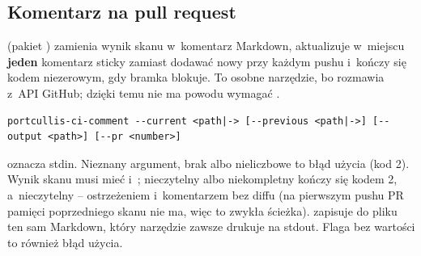 \subsection{Komentarz na pull request}\label{sec:portcullis-komentarz}

 (pakiet ) zamienia wynik
skanu w~komentarz Markdown, aktualizuje w~miejscu \textbf{jeden} komentarz sticky zamiast
dodawać nowy przy każdym pushu i~kończy się kodem niezerowym, gdy bramka blokuje. To osobne
narzędzie, bo rozmawia z~API GitHub; dzięki temu  nie ma powodu
wymagać .

\begin{lstlisting}
portcullis-ci-comment --current <path|-> [--previous <path|->] [--output <path>] [--pr <number>]
\end{lstlisting}

\repopath{-} oznacza stdin. Nieznany argument, brak  albo
nieliczbowe  to błąd użycia (kod 2). Wynik skanu musi mieć
 i~; nieczytelny albo niekompletny
 kończy się kodem 2, a~nieczytelny  -- ostrzeżeniem
i~komentarzem bez diffu (na pierwszym pushu PR pamięci poprzedniego skanu nie ma, więc to
zwykła ścieżka).  zapisuje do pliku ten sam Markdown, który
narzędzie zawsze drukuje na stdout. Flaga bez wartości to również błąd użycia.

